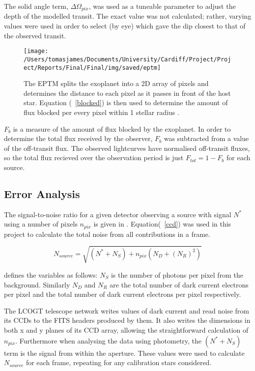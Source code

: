 \documentclass{report}
\begin{document}
The solid angle term, $\Delta \Omega_{pix}$, was used as a tuneable parameter to adjust the depth of the modelled transit. The exact value was not calculated; rather, varying values were used in order to select (by eye) which gave the dip closest to that of the observed transit.

\begin{wrapfigure}{l}{0.5\textwidth}
\vspace{-10pt}
\centering
    \texttt{[image: /Users/tomasjames/Documents/University/Cardiff/Project/Project/Reports/Final/Final/img/saved/eptm]}
\caption{The EPTM splits the exoplanet into a 2D array of pixels and determines the distance to each pixel as it passes in front of the host star. Equation (~\ref{blocked}) is then used to determine the amount of flux blocked per every pixel within 1 stellar radius \parencite{model}.}\label{log_radius_mass}
\vspace{-10pt}
\end{wrapfigure}

$F_{b}$ is a measure of the amount of flux blocked by the exoplanet. In order to determine the total flux received by the observer, $F_{b}$ was subtracted from a value of the off-transit flux. The observed lightcurves have normalised off-transit fluxes, so the total flux recieved over the observation period is just $F_{tot} = 1 - F_{b}$ for each source. 

\subsection{Error Analysis}
The signal-to-noise ratio for a given detector observing a source with signal $N^{*}$ using a number of pixels $n_{pix}$ is given in \textcite{howell}. Equation(~\ref{ccd}) was used in this project to calculate the total noise from all contributions in a frame.

\begin{equation} \label{ccd}
    N_{source} = \sqrt{(N^{*}+N_{S})+n_{pix}(N_{D}+(N_{R})^2)}
\end{equation}

\citeauthor{howell} defines the variables as follows: $N_{S}$ is the number of photons per pixel from the background. Similarly $N_{D}$ and $N_{R}$ are the total number of dark current electrons per pixel and the total number of dark current electrons per pixel respectively. 

The LCOGT telescope network writes values of dark current and read noise from its CCDs to the FITS headers produced by them. It also writes the dimensions in both x and y planes of its CCD array, allowing the straightforward calculation of $n_{pix}$. Furthermore when analysing the data using photometry, the $(N^{*}+N_{S})$ term is the signal from within the aperture. These values were used to calculate $N_{source}$ for each frame, repeating for any calibration stars considered. 
\end{document}
